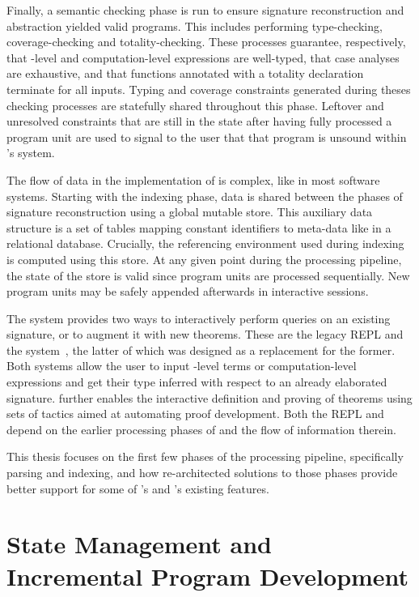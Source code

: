 Finally, a semantic checking phase is run to ensure signature reconstruction and abstraction yielded valid programs.
This includes performing type-checking, coverage-checking and totality-checking.
These processes guarantee, respectively, that \LF-level and computation-level expressions are well-typed, that case analyses are exhaustive, and that functions annotated with a totality declaration terminate for all inputs.
Typing and coverage constraints generated during theses checking processes are statefully shared throughout this phase.
Leftover and unresolved constraints that are still in the state after having fully processed a program unit are used to signal to the user that that program is unsound within \Beluga's system.

The flow of data in the implementation of \Beluga is complex, like in most software systems.
Starting with the indexing phase, data is shared between the phases of signature reconstruction using a global mutable store.
This auxiliary data structure is a set of tables mapping constant identifiers to meta-data like in a relational database.
Crucially, the referencing environment used during indexing is computed using this store.
At any given point during the processing pipeline, the state of the store is valid since program units are processed sequentially.
New program units may be safely appended afterwards in interactive sessions.

The \Beluga system provides two ways to interactively perform queries on an existing \Beluga signature, or to augment it with new theorems.
These are the legacy \ac{REPL} and the \Harpoon system~\cite{errington2021harpoon}, the latter of which was designed as a replacement for the former.
Both systems allow the user to input \LF-level terms or computation-level expressions and get their type inferred with respect to an already elaborated \Beluga signature.
\Harpoon further enables the interactive definition and proving of theorems using sets of tactics aimed at automating proof development.
Both the \ac{REPL} and \Harpoon depend on the earlier processing phases of \Beluga and the flow of information therein.

This thesis focuses on the first few phases of the \Beluga processing pipeline, specifically parsing and indexing, and how re-architected solutions to those phases provide better support for some of \Beluga's and \Harpoon's existing features.

\section{State Management and Incremental Program Development}\label{section:intro-state-management}

